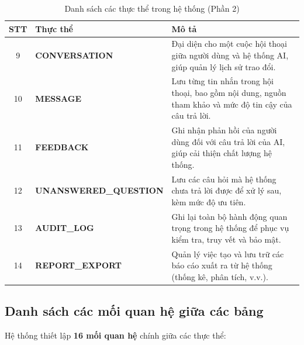 \documentclass[12pt,a4paper]{report}
\begin{document}
\begin{table}[H]
\centering
\small
\caption{Danh sách các thực thể trong hệ thống (Phần 2)}
\label{tab:entities_part2}
\begin{tabularx}{\textwidth}{|c|l|X|}
\hline
\rowcolor{gray!10}
STT & Thực thể & Mô tả \\ \hline
9 & \textbf{CONVERSATION} & Đại diện cho một cuộc hội thoại giữa người dùng và hệ thống AI, giúp quản lý lịch sử trao đổi. \\ \hline
10 & \textbf{MESSAGE} & Lưu từng tin nhắn trong hội thoại, bao gồm nội dung, nguồn tham khảo và mức độ tin cậy của câu trả lời. \\ \hline
11 & \textbf{FEEDBACK} & Ghi nhận phản hồi của người dùng đối với câu trả lời của AI, giúp cải thiện chất lượng hệ thống. \\ \hline
12 & \textbf{UNANSWERED\_QUESTION} & Lưu các câu hỏi mà hệ thống chưa trả lời được để xử lý sau, kèm mức độ ưu tiên. \\ \hline
13 & \textbf{AUDIT\_LOG} & Ghi lại toàn bộ hành động quan trọng trong hệ thống để phục vụ kiểm tra, truy vết và bảo mật. \\ \hline
14 & \textbf{REPORT\_EXPORT} & Quản lý việc tạo và lưu trữ các báo cáo xuất ra từ hệ thống (thống kê, phân tích, v.v.). \\ \hline
\end{tabularx}
\end{table}

\subsection{Danh sách các mối quan hệ giữa các bảng}

Hệ thống thiết lập \textbf{16 mối quan hệ} chính giữa các thực thể:
\end{document}
